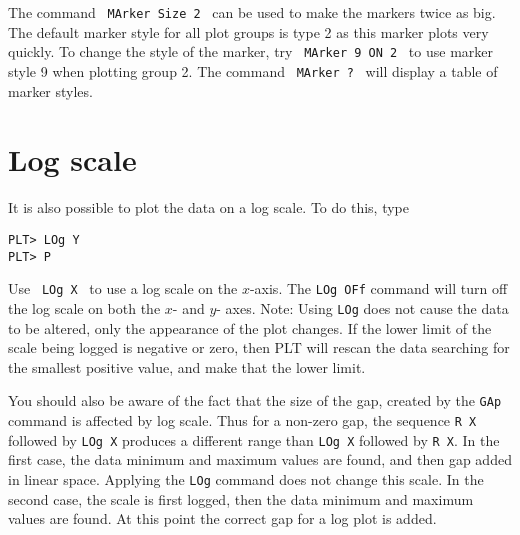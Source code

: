 The command \, {\tt MArker~Size~2} \,
can be used to make the markers twice as big.
The default marker style for all plot groups is type 2
as this marker plots very quickly.
To change the style of the marker, try \, {\tt MArker~9~ON~2} \,
to use marker style 9 when plotting group 2.
The command \, {\tt MArker~?} \, will display a table of marker styles.

\section{Log scale}

It is also possible to plot the data on a log scale.
To do this, type
\begin{verbatim}
PLT> LOg Y
PLT> P
\end{verbatim}
Use \, {\tt LOg~X} \, to use a log scale on the $x$-axis.
The {\tt LOg~OFf} command will turn off the log scale on both
the $x$- and $y$- axes.
Note: Using {\tt LOg} does not cause the data to be altered,
only the appearance of the plot changes.
If the lower limit of the scale being logged is negative or zero,
then PLT will rescan the data searching for the smallest positive
value, and make that the lower limit.

You should also be aware of the fact that the size of the gap,
created by the {\tt GAp} command is affected by log scale.
Thus for a non-zero gap, the sequence {\tt R~X} followed by {\tt LOg~X}
produces a different range than {\tt LOg~X} followed by {\tt R~X}.
In the first case, the data minimum and maximum values are found,
and then gap added in linear space.
Applying the {\tt LOg} command does not change this scale.
In the second case, the scale is first logged, then the data minimum
and maximum values are found.
At this point the correct gap for a log plot is added.
